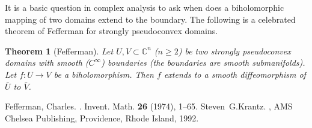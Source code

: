 \documentclass[12pt]{article}
\theoremstyle{theorem}
\newtheorem*{thm}{Theorem}
\theoremstyle{definition}
\theoremstyle{remark}
\begin{document}
It is a basic question in complex analysis to ask when does a biholomorphic mapping of two domains extend to the boundary.  The following is a celebrated theorem of Fefferman for strongly pseudoconvex domains.

\begin{thm}[Fefferman]
Let $U, V \subset {\mathbb{C}}^n$ ($n \geq 2$) be two strongly pseudoconvex domains with smooth ($C^\infty$) boundaries (the boundaries are smooth submanifolds).  Let $f \colon U \to V$ be a biholomorphism.
Then $f$ extends to a smooth diffeomorphism of $\bar{U}$ to $\bar{V}$.
\end{thm}


\begin{thebibliography}{9}
Fefferman, Charles.
{\em {}}.
Invent. Math. {\bf 26} (1974), 1--65. 
Steven~G.\@ Krantz.
{\em {}},
AMS Chelsea Publishing, Providence, Rhode Island, 1992.
\end{thebibliography}
\end{document}
